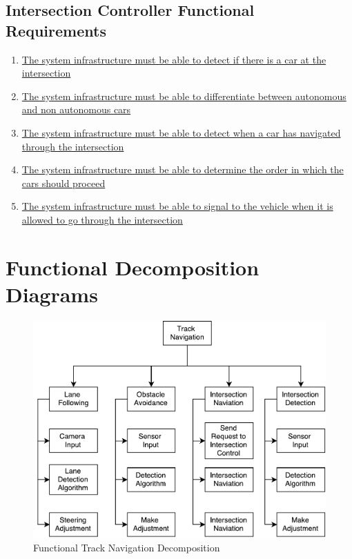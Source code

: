 \documentclass [11pt]{article}
\begin{document}
\subsection{Intersection Controller Functional Requirements}
\begin{enumerate}[label=\textbf{IC\arabic*:}, ref =IC\arabic*, leftmargin=0.8in]

	\item \label{IC1} \hyperref[sec:changeL]{The system infrastructure must be able to detect if there is a car at the intersection } %

	
	\item \label{IC2}\hyperref[sec:changeL]{The system infrastructure must be able to differentiate between autonomous and non autonomous cars} %
	
	\item \label{IC3}\hyperref[sec:changeL]{The system infrastructure must be able to detect when a car has navigated through the intersection} %

    \item \label{IC4}\hyperref[sec:changeL]{The system infrastructure must be able to determine the order in which the cars should proceed} %
    
    \item \label{IC5} \hyperref[sec:changeL]{The system infrastructure must be able to signal to the vehicle when it is allowed to go through the intersection} %
\end{enumerate}

\break
\section{Functional Decomposition Diagrams}
\begin{figure} [h!]
	\vspace*{-5mm}
	\centering
	\includegraphics [scale =.7] {figures/function_decomp_track_n.pdf}
	\caption{Functional Track Navigation Decomposition}
\end{figure}
\end{document}
